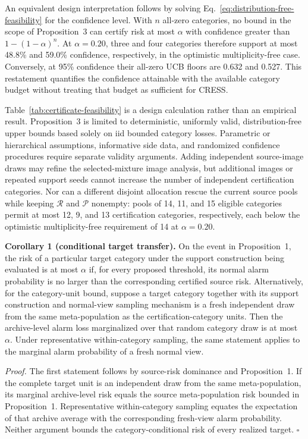An equivalent design interpretation follows by solving Eq.~\eqref{eq:distribution-free-feasibility} for the confidence level. With $n$ all-zero categories, no bound in the scope of Proposition~3 can certify risk at most $\alpha$ with confidence greater than $1-(1-\alpha)^n$. At $\alpha=0.20$, three and four categories therefore support at most 48.8\% and 59.0\% confidence, respectively, in the optimistic multiplicity-free case. Conversely, at 95\% confidence their all-zero UCB floors are 0.632 and 0.527. This restatement quantifies the confidence attainable with the available category budget without treating that budget as sufficient for CRESS\@.



Table~\ref{tab:certificate-feasibility} is a design calculation rather than an empirical result. Proposition~3 is limited to deterministic, uniformly valid, distribution-free upper bounds based solely on iid bounded category losses. Parametric or hierarchical assumptions, informative side data, and randomized confidence procedures require separate validity arguments. Adding independent source-image draws may refine the selected-mixture image analysis, but additional images or repeated support seeds cannot increase the number of independent certification categories. Nor can a different disjoint allocation rescue the current source pools while keeping $\mathcal R$ and $\mathcal P$ nonempty: pools of 14, 11, and 15 eligible categories permit at most 12, 9, and 13 certification categories, respectively, each below the optimistic multiplicity-free requirement of 14 at $\alpha=0.20$.

\noindent\textbf{Corollary 1 (conditional target transfer).} On the event in Proposition~1, the risk of a particular target category under the support construction being evaluated is at most $\alpha$ if, for every proposed threshold, its normal alarm probability is no larger than the corresponding certified source risk. Alternatively, for the category-unit bound, suppose a target category together with its support construction and normal-view sampling mechanism is a fresh independent draw from the same meta-population as the certification-category units. Then the archive-level alarm loss marginalized over that random category draw is at most $\alpha$. Under representative within-category sampling, the same statement applies to the marginal alarm probability of a fresh normal view.

\noindent\emph{Proof.} The first statement follows by source-risk dominance and Proposition~1. If the complete target unit is an independent draw from the same meta-population, its marginal archive-level risk equals the source meta-population risk bounded in Proposition~1. Representative within-category sampling equates the expectation of that archive average with the corresponding fresh-view alarm probability. Neither argument bounds the category-conditional risk of every realized target. \hfill$\square$

